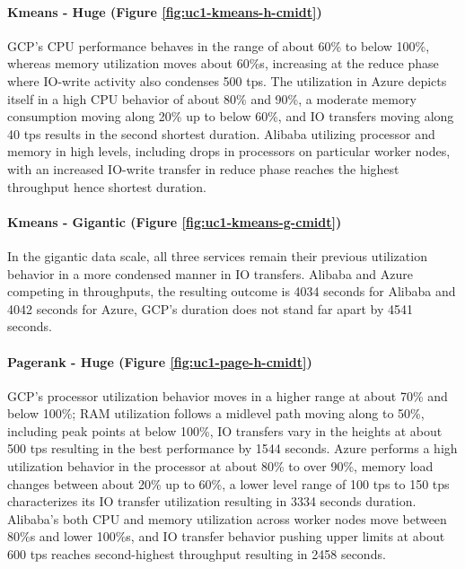\documentclass[review]{elsarticle}
\begin{document}
\paragraph{Kmeans - Huge (Figure \ref{fig:uc1-kmeans-h-cmidt})}GCP's CPU performance behaves in the range of about 60\% to below 100\%, whereas memory utilization moves about 60\%s, increasing at the reduce phase where IO-write activity also condenses 500 tps. The utilization in Azure depicts itself in a high CPU behavior of about 80\% and 90\%, a moderate memory consumption moving along 20\% up to below 60\%, and IO transfers moving along 40 tps results in the second shortest duration. Alibaba utilizing processor and memory in high levels, including drops in processors on particular worker nodes, with an increased IO-write transfer in reduce phase reaches the highest throughput hence shortest duration.

\paragraph{Kmeans - Gigantic (Figure \ref{fig:uc1-kmeans-g-cmidt})}In the gigantic data scale, all three services remain their previous utilization behavior in a more condensed manner in IO transfers. Alibaba and Azure competing in throughputs, the resulting outcome is 4034 seconds for Alibaba and 4042 seconds for Azure, GCP's duration does not stand far apart by 4541 seconds.

\paragraph{Pagerank - Huge (Figure \ref{fig:uc1-page-h-cmidt})}GCP's processor utilization behavior moves in a higher range at about 70\% and below 100\%; RAM utilization follows a midlevel path moving along to 50\%, including peak points at below 100\%, IO transfers vary in the heights at about 500 tps resulting in the best performance by 1544 seconds. Azure performs a high utilization behavior in the processor at about 80\% to over 90\%, memory load changes between about 20\% up to 60\%, a lower level range of 100 tps to 150 tps characterizes its IO transfer utilization resulting in 3334 seconds duration. Alibaba's both CPU and memory utilization across worker nodes move between 80\%s and lower 100\%s, and IO transfer behavior pushing upper limits at about 600 tps reaches second-highest throughput resulting in 2458 seconds.
\end{document}
